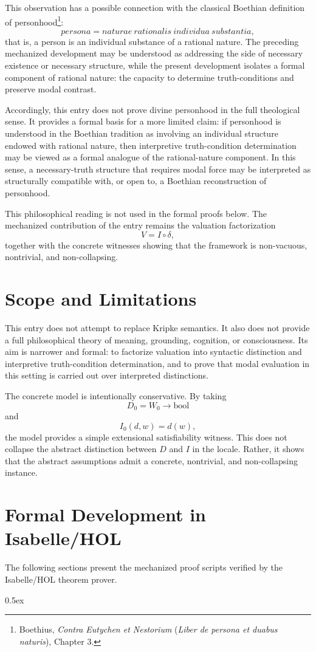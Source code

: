 \documentclass[11pt,a4paper]{article}
\begin{document}
This observation has a possible connection with the classical Boethian definition of personhood\footnote{Boethius, \textit{Contra Eutychen et Nestorium} (\textit{Liber de persona et duabus naturis}), Chapter 3.}:
\[
persona = naturae\ rationalis\ individua\ substantia,
\]
that is, a person is an individual substance of a rational nature. The preceding mechanized development may be understood as addressing the side of necessary existence or necessary structure, while the present development isolates a formal component of rational nature: the capacity to determine truth-conditions and preserve modal contrast.

Accordingly, this entry does not prove divine personhood in the full theological sense. It provides a formal basis for a more limited claim: if personhood is understood in the Boethian tradition as involving an individual structure endowed with rational nature, then interpretive truth-condition determination may be viewed as a formal analogue of the rational-nature component. In this sense, a necessary-truth structure that requires modal force may be interpreted as structurally compatible with, or open to, a Boethian reconstruction of personhood.

This philosophical reading is not used in the formal proofs below. The mechanized contribution of the entry remains the valuation factorization
\[
V = I \circ \delta,
\]
together with the concrete witnesses showing that the framework is non-vacuous, nontrivial, and non-collapsing.

\section{Scope and Limitations}

This entry does not attempt to replace Kripke semantics. It also does not provide a full philosophical theory of meaning, grounding, cognition, or consciousness. Its aim is narrower and formal: to factorize valuation into syntactic distinction and interpretive truth-condition determination, and to prove that modal evaluation in this setting is carried out over interpreted distinctions.

The concrete model is intentionally conservative. By taking
\[
D_0 = W_0 \to \mathrm{bool}
\]
and
\[
I_0(d,w)=d(w),
\]
the model provides a simple extensional satisfiability witness. This does not collapse the abstract distinction between $D$ and $I$ in the locale. Rather, it shows that the abstract assumptions admit a concrete, nontrivial, and non-collapsing instance.

\newpage
\section{Formal Development in Isabelle/HOL}

The following sections present the mechanized proof scripts verified by the Isabelle/HOL theorem prover.

\parindent 0pt\parskip 0.5ex





\end{document}
